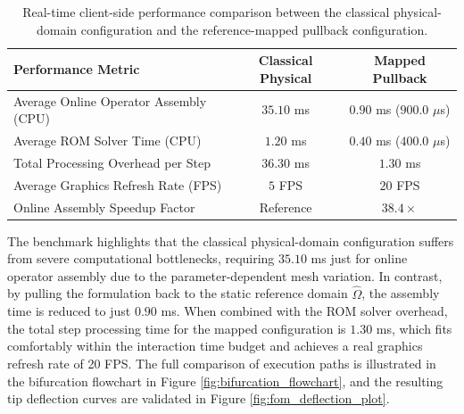 \begin{table}[htbp]
\centering
\caption{Real-time client-side performance comparison between the classical physical-domain configuration and the reference-mapped pullback configuration.}
\label{tab:performance_benchmarks}
\footnotesize
\setlength{\tabcolsep}{6pt}
\begin{tabular}{lcc}
\toprule
\textbf{Performance Metric} & \textbf{Classical Physical} & \textbf{Mapped Pullback} \\ \midrule
Average Online Operator Assembly (CPU) & $35.10$ ms & $0.90$ ms ($900.0$ $\mu$s) \\
Average ROM Solver Time (CPU)          & $1.20$ ms & $0.40$ ms ($400.0$ $\mu$s) \\
Total Processing Overhead per Step     & $36.30$ ms & $1.30$ ms \\
Average Graphics Refresh Rate (FPS)    & $5$ FPS & $20$ FPS \\
Online Assembly Speedup Factor         & Reference & $\mathbf{38.4\times}$ \\ \bottomrule
\end{tabular}
\end{table}

The benchmark highlights that the classical physical-domain configuration suffers from severe computational bottlenecks, requiring $35.10$ ms just for online operator assembly due to the parameter-dependent mesh variation. In contrast, by pulling the formulation back to the static reference domain $\hat{\Omega}$, the assembly time is reduced to just $0.90$ ms. When combined with the ROM solver overhead, the total step processing time for the mapped configuration is $1.30$ ms, which fits comfortably within the interaction time budget and achieves a real graphics refresh rate of 20 FPS. The full comparison of execution paths is illustrated in the bifurcation flowchart in Figure \ref{fig:bifurcation_flowchart}, and the resulting tip deflection curves are validated in Figure \ref{fig:fom_deflection_plot}.

